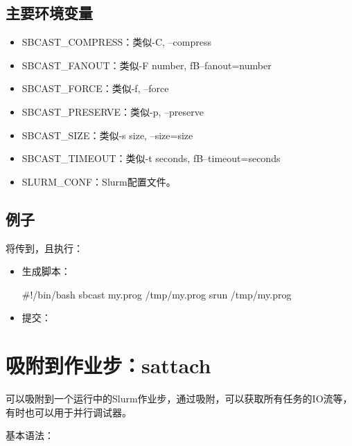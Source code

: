 \subsection{主要环境变量}
\begin{itemize}
	\item SBCAST\_COMPRESS：类似-C, --compress
    \item SBCAST\_FANOUT：类似-F number, fB--fanout=number
    \item SBCAST\_FORCE：类似-f, --force
    \item SBCAST\_PRESERVE：类似-p, --preserve
    \item SBCAST\_SIZE：类似-s size, --size=size
    \item SBCAST\_TIMEOUT：类似-t seconds, fB--timeout=seconds
    \item SLURM\_CONF：Slurm配置文件。
\end{itemize}

\subsection{例子}

将传到，且执行：

\begin{itemize}
	\item 生成脚本：
\begin{SH}
#!/bin/bash
sbcast my.prog /tmp/my.prog
srun /tmp/my.prog
\end{SH}
	\item 提交：

\end{itemize}

\section{吸附到作业步：sattach}

可以吸附到一个运行中的Slurm作业步，通过吸附，可以获取所有任务的IO流等，有时也可以用于并行调试器。

基本语法：

